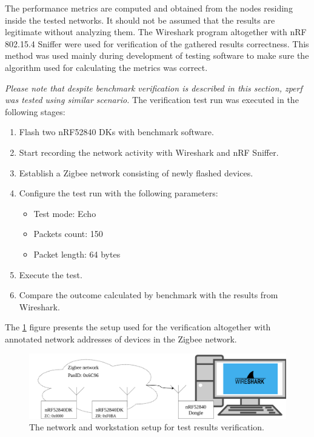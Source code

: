 The performance metrics are computed and obtained from the nodes residing inside 
the tested networks. It should not be assumed that the results are legitimate without
analyzing them. The Wireshark program altogether with nRF 802.15.4 Sniffer were used for verification of the gathered results correctness. This method was used mainly during development of testing
software to make sure the algorithm used for calculating the metrics was correct.

\textit{Please note that despite benchmark verification is described in this section, zperf was tested using similar scenario.} The verification test run was executed in the following stages:

\begin{enumerate}
    \itemsep0em
    \item Flash two nRF52840 DKs with benchmark software.
    \item Start recording the network activity with Wireshark and nRF Sniffer.
    \item Establish a Zigbee network consisting of newly flashed devices.
    \item Configure the test run with the following parameters:
    \begin{itemize}
        \itemsep0em
        \item Test mode: Echo
        \item Packets count: 150
        \item Packet length: 64 bytes 
    \end{itemize}
    \item Execute the test.
    \item Compare the outcome calculated by benchmark with the results 
    from Wireshark.
\end{enumerate}

The \ref{fig:verification} figure presents the setup used for the verification 
altogether with annotated network addresses of devices in the Zigbee network.

\begin{figure}[H]
    \centering
    \includegraphics[scale=0.3]{images/verification.png}
    \caption{The network and workstation setup for test results verification.}
    \label{fig:verification}
\end{figure}

